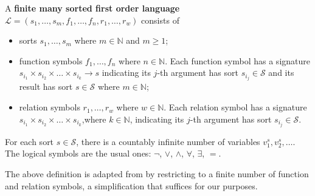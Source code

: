 \begin{definition}
    A \textbf{finite many sorted first order language} 
    \( \mathcal{L} \mathop{=} (s_1,\dots,s_m,f_1,\dots, f_n, r_1, \dots, r_w ) \)
    consists of
    \begin{itemize}
        \item sorts $s_1,\dots,s_m$ where $m \mathop{\in} \mathbb{N}$ and $m \mathop{\geq} 1$;
        \item function symbols $f_1,\dots, f_n$ where $n\in \mathbb{N}$. Each function symbol has a signature $s_{i_1} \mathop{\times} s_{i_2} \mathop{\times} \dots \mathop{\times} s_{i_k} \mathop{\to} s$ indicating its $j$-th argument has sort $s_{i_j} \mathop{\in} \mathcal{S}$ and its result has sort $s \mathop{\in} \mathcal{S}$ where $m \mathop{\in} \mathbb{N}$;
        \item relation symbols $r_1,\dots, r_w$ where $ w\in \mathbb{N}$. Each  relation symbol has a signature $s_{i_1} \mathop{\times} s_{i_2} \mathop{\times} \dots \mathop{\times} s_{i_k}$,where $k \mathop{\in} \mathbb{N}$, indicating its $j$-th argument has sort $s_{i_j} \mathop{\in} \mathcal{S}$.
    \end{itemize}  
    For each sort $s \mathop{\in} \mathcal{S}$, there is a countably infinite number of variables $v_1^s, v_2^s, \dots$. The logical symbols are the usual ones: $\neg$, $\vee$, $\wedge$, $\forall$, $\exists$, $=$.
\end{definition}
The above definition is adapted from \cite[Def.~29.26]{monk2012mathematical} by restricting to a finite number of function and relation symbols, a simplification that suffices for our purposes.

